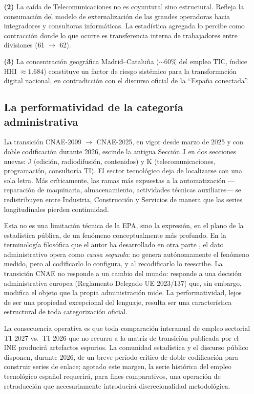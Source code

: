 \documentclass[11pt,a4paper]{article}
\begin{document}
\textbf{(2)} La caída de Telecomunicaciones no es coyuntural sino estructural.
Refleja la consumación del modelo de externalización de las grandes operadoras
hacia integradores y consultoras informáticas. La estadística agregada lo
percibe como contracción donde lo que ocurre es transferencia interna de
trabajadores entre divisiones (61 $\rightarrow$ 62).

\textbf{(3)} La concentración geográfica Madrid--Cataluña ($\sim 60\%$ del
empleo TIC, índice HHI $\approx 1.684$) constituye un factor de riesgo
sistémico para la transformación digital nacional, en contradicción con el
discurso oficial de la ``España conectada''.

\subsection{La performatividad de la categoría administrativa}

\noindent
La transición CNAE-2009 $\rightarrow$ CNAE-2025, en vigor desde marzo de 2025
y con doble codificación durante 2026, escinde la antigua Sección J en dos
secciones nuevas: J (edición, radiodifusión, contenidos) y K (telecomunicaciones,
programación, consultoría TI). El sector tecnológico deja de localizarse con
una sola letra. Más críticamente, las ramas más expuestas a la automatización
---reparación de maquinaria, almacenamiento, actividades técnicas auxiliares---
se redistribuyen entre Industria, Construcción y Servicios de manera que las
series longitudinales pierden continuidad.

Esta no es una limitación técnica de la EPA, sino la expresión, en el plano de
la estadística pública, de un fenómeno conceptualmente más profundo. En la
terminología filosófica que el autor ha desarrollado en otra parte
\citep{tamames2024causa}, el dato administrativo opera como \emph{causa segunda}:
no genera autónomamente el fenómeno medido, pero al codificarlo lo configura,
y al recodificarlo lo reescribe. La transición CNAE no responde a un cambio
del mundo: responde a una decisión administrativa europea (Reglamento Delegado
UE 2023/137) que, sin embargo, modifica el objeto que la propia administración
mide. La performatividad, lejos de ser una propiedad excepcional del lenguaje,
resulta ser una característica estructural de toda categorización oficial.

La consecuencia operativa es que toda comparación interanual de empleo
sectorial T1 2027 vs.\ T1 2026 que no recurra a la matriz de transición
publicada por el INE producirá artefactos espurios. La comunidad estadística
y el discurso público disponen, durante 2026, de un breve período crítico de
doble codificación para construir series de enlace; agotado este margen, la
serie histórica del empleo tecnológico español requerirá, para fines
comparativos, una operación de retraducción que necesariamente introducirá
discrecionalidad metodológica.
\end{document}
